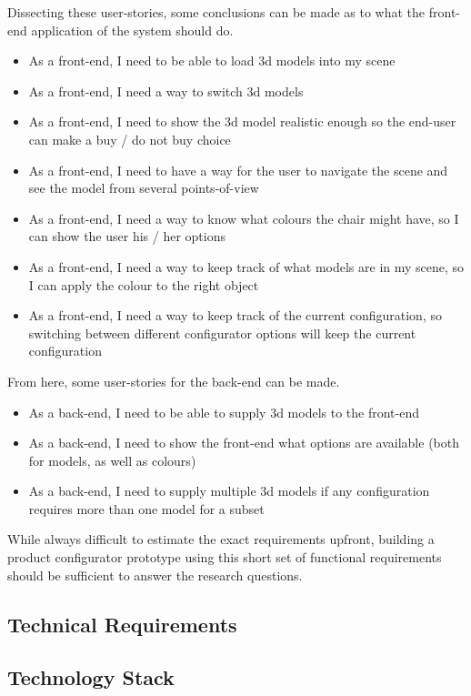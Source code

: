 Dissecting these user-stories, some conclusions can be made as to what the front-end application of the system should do.
\begin{itemize}
	\item As a front-end, I need to be able to load 3d models into my scene
	\item As a front-end, I need a way to switch 3d models
	\item As a front-end, I need to show the 3d model realistic enough so the end-user can make a buy / do not buy choice
	\item As a front-end, I need to have a way for the user to navigate the scene and see the model from several points-of-view
	\item As a front-end, I need a way to know what colours the chair might have, so I can show the user his / her options
	\item As a front-end, I need a way to keep track of what models are in my scene, so I can apply the colour to the right object
	\item As a front-end, I need a way to keep track of the current configuration, so switching between different configurator options will keep the current configuration
\end{itemize}

From here, some user-stories for the back-end can be made.
\begin{itemize}
	\item As a back-end, I need to be able to supply 3d models to the front-end
	\item As a back-end, I need to show the front-end what options are available (both for models, as well as colours)
	\item As a back-end, I need to supply multiple 3d models if any configuration requires more than one model for a subset
\end{itemize}

While always difficult to estimate the exact requirements upfront, building a product configurator prototype using this short set of functional requirements should be sufficient to answer the research questions.

\subsection{Technical Requirements}

\subsection{Technology Stack}
